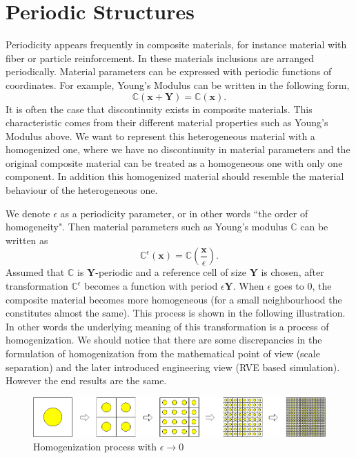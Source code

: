 \documentclass[10pt,a4paper]{scrreprt}
\begin{document}
\section{Periodic Structures}
\label{sec:peri}
Periodicity appears frequently in composite materials, for instance material with fiber or particle reinforcement. In these materials inclusions are arranged periodically. Material parameters can be expressed with periodic functions of coordinates. For example, Young's Modulus can be written in the following form,
%
\begin{equation}
\label{eq:periodic 1}
\mathbb{C}(\mathbf{x}+\mathbf{Y}) = \mathbb{C}(\mathbf{x}).
\end{equation}
%
It is often the case that discontinuity exists in composite materials. This characteristic comes from their different material properties such as Young's Modulus above. We want to represent this heterogeneous material with a homogenized one, where we have no discontinuity in material parameters and the original composite material can be treated as a homogeneous one with only one component. In addition this homogenized material should resemble the material behaviour of the heterogeneous one.

We denote $\epsilon$ as a periodicity parameter, or in other words ``the order of homogeneity". Then material parameters such as Young's modulus $\mathbb{C}$ can be written as
%
\begin{equation}
\mathbb{C}^{\epsilon}(\mathbf{x}) = \mathbb{C} \left( \dfrac{\mathbf{x}}{\epsilon} \right).
\end{equation}
%
Assumed that $\mathbb{C}$ is $\mathbf{Y}$-periodic and a reference cell of size $\mathbf{Y}$ is chosen, after transformation $\mathbb{C}^{\epsilon}$ becomes a function with period $\epsilon \mathbf{Y}$. When $\epsilon$ goes to 0, the composite material becomes more homogeneous (for a small neighbourhood the constitutes almost the same). This process is shown in the following illustration. In other words the underlying meaning of this transformation is a process of homogenization. We should notice that there are some discrepancies in the formulation of homogenization from the mathematical point of view (scale separation) and the later introduced engineering view (RVE based simulation). However the end results are the same.

\begin{figure}[h]
  \centering
    \label{fig: homo proc}
    \includegraphics[width=0.8\linewidth]{../pics/homo_proc.png}
  \caption{Homogenization process with $\epsilon \to 0$}
\end{figure}
\end{document}
